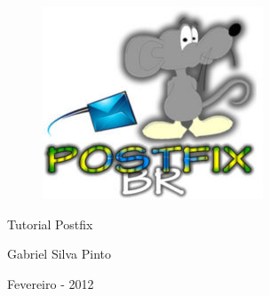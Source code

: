 \thispagestyle{empty}

\begin{center}
  \begin{figure}[H]
    \begin{center}
      \hspace{-1cm}
      \includegraphics[width=0.30\columnwidth]{titlepage.png}
    \end{center}      
  \end{figure}

  \vskip 2cm

  \hspace{-1cm}
  \begin{minipage}[c]{12cm}
    \begin{center}

{\huge \sf Tutorial Postfix\vskip 0.15cm %

{\small Gabriel Silva Pinto} %
}
    \end{center}
  \end{minipage}

  \vskip 16cm

  {\huge Fevereiro - 2012} %

\end{center}
